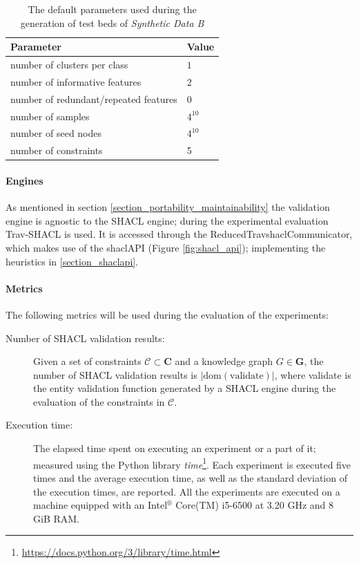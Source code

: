 \begin{table}
    \centering
    \begin{tabular}{p{7cm}|l}
        \toprule
        Parameter & Value\\
        \midrule
        \midrule
        number of clusters per class & $1$\\
        number of informative features & $2$ \\
        number of redundant/repeated features & $0$\\
        number of samples & $4^{10}$\\
        number of seed nodes & $4^{10}$\\
        number of constraints & 5 \\
        \bottomrule
    \end{tabular}    
    \caption{The default parameters used during the generation of test beds of \textit{Synthetic Data B}}
    \label{fig:parameters_used_to_generate_the_custom_dataset}
\end{table}

\paragraph{Engines} As mentioned in section \ref{section_portability_maintainability} the validation engine is agnostic to the SHACL engine; during the experimental evaluation Trav-SHACL \cite{figuera2021trav} is used. It is accessed through the \glqq ReducedTravshaclCommunicator\grqq{}, which makes use of the shaclAPI (Figure \ref{fig:shacl_api}); implementing the heuristics in \ref{section_shaclapi}.

\paragraph{Metrics}
The following metrics will be used during the evaluation of the experiments:
\begin{description}
\item[Number of SHACL validation results:] Given a set of constraints $\mathcal{C} \subset \mathbf{C}$ and a knowledge graph $G \in \mathbf{G}$, the number of SHACL validation results is $|\text{dom}(\text{validate})|$, where validate is the entity validation function generated by a SHACL engine during the evaluation of the constraints in $\mathcal{C}$.
\item[Execution time:] The elapsed time spent on executing an experiment or a part of it; measured using the Python library \emph{time}\footnote{\href{https://docs.python.org/3/library/time.html}{https://docs.python.org/3/library/time.html}}. Each experiment is executed five times and the average execution time, as well as the standard deviation of the execution times, are reported. 
All the experiments are executed on a machine equipped with an Intel$^\text{®}$ Core(TM) i5-6500 at 3.20 GHz and 8 GiB RAM.
\end{description}